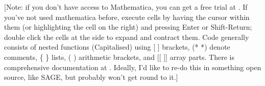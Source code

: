 \documentclass[10pt,a4paper, onecolumn]{article}
\begin{document}
[Note: if you don't have access to Mathematica, you can get a free trial at \href{http://www.wolfram.com/products/mathematica/experience/request.cgi}{}. If you've not used mathematica before, execute cells by having the cursor within them (or highlighting the cell on the right) and pressing Enter or Shift-Return; double click the cells at the side to expand and contract them. Code generally consists of nested functions (Capitalised) using [ ] brackets, (* *) denote comments, \{ \} lists, ( ) arithmetic brackets, and [[ ]] array parts. There is comprehensive documentation at \href{http://reference.wolfram.com/mathematica/guide/Mathematica.html}{}. Ideally, I'd like to re-do this in something open source, like SAGE, but probably won't get round to it.]
\end{document}
